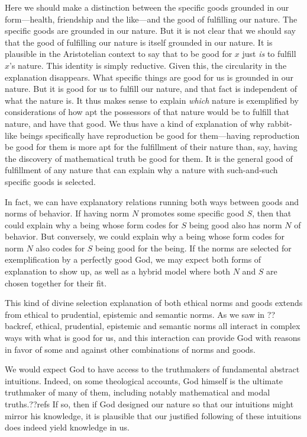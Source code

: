 Here we should make a distinction between the specific goods grounded in our form---health, friendship and the like---and
the good of fulfilling our nature. The specific goods are grounded in our nature. But it is not clear that we should say that 
the good of fulfilling our nature is itself grounded in our nature. It is plausible in the Aristotelian context to say that 
to be good for $x$ just \textit{is} to fulfill $x$'s nature. This identity is simply reductive. Given this, the circularity
in the explanation disappears. What specific things are good for us is grounded in our nature. But it is good for us to fulfill
our nature, and that fact is independent of what the nature is. It thus makes sense to explain \textit{which} nature is 
exemplified by considerations of how apt the possessors of that nature would be to fulfill that nature, and have that good.
We thus have a kind of explanation of why rabbit-like beings specifically have reproduction be good for them---having reproduction
be good for them is more apt for the fulfillment of their nature than, say, having the discovery of mathematical truth be good
for them. It is the general good of fulfillment of any nature that can explain why a nature with such-and-such specific goods is
selected.

In fact, we can have explanatory relations running both ways between goods and norms of behavior. If having norm $N$ promotes
some specific good $S$, then that could explain why a being whose form codes for $S$ being good also has norm $N$ of behavior.
But conversely, we could explain why a being whose form codes for norm $N$ also codes for $S$ being good for the being. 
If the norms are selected for exemplification by a perfectly good God, we may expect both forms of explanation to show up,
as well as a hybrid model where both $N$ and $S$ are chosen together for their fit.

This kind of divine selection explanation of both ethical norms and goods extends from ethical to prudential, epistemic and 
semantic norms. As we saw in ??backref, ethical, prudential, epistemic and semantic norms all interact in complex ways with 
what is good for us, and this interaction can provide God with reasons in favor of some and against other combinations of
norms and goods.

We would expect God to have access to the truthmakers of fundamental abstract intuitions. Indeed, on some theological accounts,
God himself is the ultimate truthmaker of many of them, including notably mathematical and modal truths.??refs If so, then 
if God designed our nature so that our intuitions might mirror his knowledge, it is plausible that our justified following of
these intuitions does indeed yield knowledge in us.

